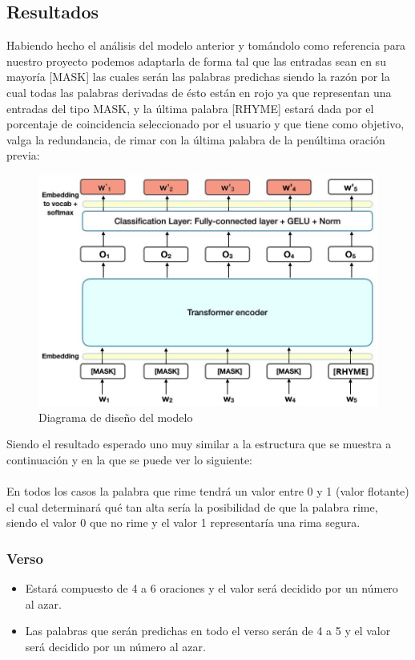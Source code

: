 \documentclass[12pt, a4paper, titlepage]{report}
\begin{document}
		\subsection{Resultados} %
		
		Habiendo hecho el análisis del modelo anterior y tomándolo como referencia para nuestro proyecto podemos adaptarla de forma tal que las entradas sean en su mayoría [MASK] las cuales serán las palabras predichas siendo la razón por la cual todas las palabras derivadas de ésto están en rojo ya que representan una entradas del tipo MASK, y la última palabra [RHYME] estará dada por el porcentaje de coincidencia seleccionado por el usuario y que tiene como objetivo, valga la redundancia, de rimar con la última palabra de la penúltima oración previa: 
		\begin{figure}[H]
			\includegraphics[width=12cm]{./imagenes/Disenio/Iteracion_3/bert_output_model.jpg}
			\centering 
			\caption{Diagrama de diseño del modelo}
		\end{figure}
		
		Siendo el resultado esperado uno muy similar a la estructura que se muestra a continuación y en la que se puede ver lo siguiente:\\\\
		En todos los casos la palabra que rime tendrá un valor entre 0 y 1 (valor flotante) el cual determinará qué tan alta sería la posibilidad de que la palabra rime, siendo el valor 0 que no rime y el valor 1 representaría una rima segura. \\
		
		\subsubsection*{Verso}
		\begin{itemize}
			\item Estará compuesto de 4 a 6 oraciones y el valor será decidido por un número al azar.
			\item Las palabras que serán predichas en todo el verso serán de 4 a 5 y el valor será decidido por un número al azar.
		\end{itemize}
		
\end{document}

